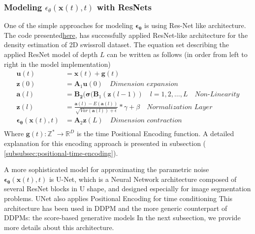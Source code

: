 \documentclass[11pt]{article}
\begin{document}
    \subsubsection{Modeling $\epsilon_{\theta}(\mathbf{x}(t),t)$ with ResNets}
    One of the simple approaches for modeling $\bm{\epsilon}_\bm{\theta}$ is using Res-Net like architecture.
    The code presented\href{https://github.com/Jmkernes/Diffusion/blob/main/diffusion/ddpm/main.py#L101}{here}\cite{Jmkernes71:online}, has
    successfully applied ResNet-like architecture for the density estimation of 2D swissroll dataset\cite{sklearnd99:online}.
    The equation set describing the applied ResNet model of depth $L$ can be written as follows
    (in order from left to right in the model implementation)
    \begin{equation}
        \begin{aligned}
            \mathbf{u}(t) &= \mathbf{x}(t) + \mathbf{g}(t) \\
            \mathbf{z}(0) &= \mathbf{A}_1 \mathbf{u}(0) \quad \textit{Dimension expansion} \\
            \mathbf{a}(l) &= \mathbf{B_2}(\bm{\sigma}(\mathbf{B}_1(\mathbf{z}(l-1)) \quad l=1,2,\dots,L \quad \textit{Non-Linearity}\\
            \mathbf{z}(l) &= \frac{\mathbf{a}(l)-E(\mathbf{a}(l))}{\sqrt {Var(\mathbf{a}(l))+\epsilon}}*\gamma + \beta \quad \textit{Normalization Layer } \\
            \bm{\epsilon}_{\bm{\theta}}(\mathbf{x}(t),t) &=\mathbf{A}_2\mathbf{z}(L) \quad \textit{Dimension contraction}\\
        \end{aligned}\label{eq:ddpm-resnet}
    \end{equation}
    Where $\mathbf{g}(t):\mathbb{Z}^* \rightarrow \mathbb{R}^D$ is the time Positional Encoding function.
    A detailed explanation for this encoding approach is presented in subsection ( \ref{subsubsec:positional-time-encoding}).



    A more sophisticated model for approximating the parametric noise $\bm{\epsilon}_{\bm{\theta}}(\mathbf{x}(t),t)$ is
    U-Net, which is a Neural Network architecture composed of several ResNet blocks in U shape, and designed
    especially for image segmentation problems\cite{ronneberger2015unet}.
    UNet also applies Positional Encoding for time conditioning \cite{WhatareD38:online}
    This architecture has been used in DDPM \cite{ho2020denoising} and the more generic counterpart of DDPMs: the score-based
    generative models \cite{song2020generative,song2021scorebased,Generati50:online}
    In the next subsection, we provide more details about this architecture.
\end{document}
